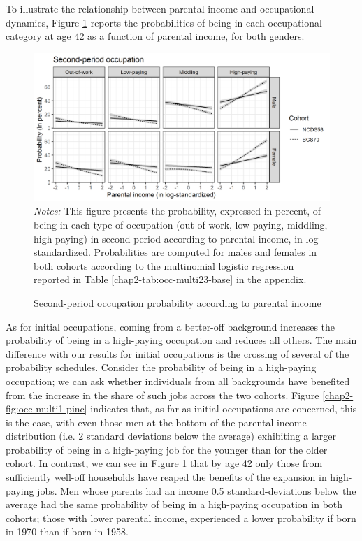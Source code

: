 To illustrate the relationship between parental income and occupational dynamics, Figure \ref{chap2-fig:occ-multi2-pinc} reports the probabilities of being in each occupational category at age 42 as a function of parental income, for both genders.
\begin{figure}[!tb]
    \centering
    \caption{Second-period occupation probability according to parental income}
    \label{chap2-fig:occ-multi2-pinc}
    \includegraphics[width=\linewidth]{chap2/graphic/occ-multi2-pinc.png}
    \vspace{-3em}
	\justify\singlespacing\footnotesize{\textit{Notes:} This figure presents the probability, expressed in percent, of being in each type of occupation (out-of-work, low-paying, middling, high-paying) in second period according to parental income, in log-standardized.
	Probabilities are computed for males and females in both cohorts according to the multinomial logistic regression reported in Table \ref{chap2-tab:occ-multi23-base} in the appendix.}
\end{figure}
As for initial occupations, coming from a better-off background increases the probability of being in a high-paying occupation and reduces all others. The main difference with our results for initial occupations is the crossing of several of the probability schedules. Consider the probability of being in a high-paying occupation; we can ask whether individuals from all backgrounds have benefited from the increase in the share of such jobs across the two cohorts. Figure \ref{chap2-fig:occ-multi1-pinc} indicates that, as far as initial occupations are concerned, this is the case, with even those men at the bottom of the parental-income distribution (i.e. 2 standard deviations below the average) exhibiting a larger probability of being in a high-paying job for the younger than for the older cohort. In contrast, we can see in Figure \ref{chap2-fig:occ-multi2-pinc} that by age 42 only those from sufficiently well-off households have reaped the benefits of the expansion in high-paying jobs. Men whose parents had an income 0.5 standard-deviations below the average had the same probability of being in a high-paying occupation in both cohorts; those with lower parental income, experienced a lower probability if born in 1970 than if born in 1958.

